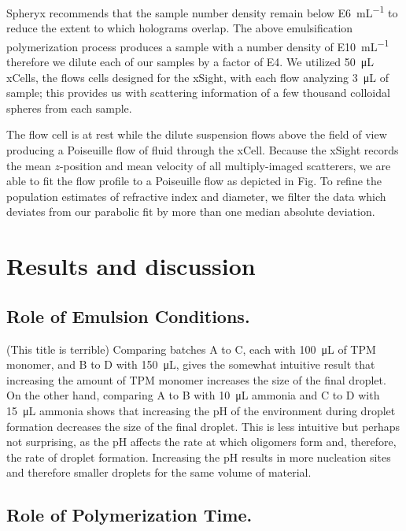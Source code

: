 Spheryx recommends that the sample number density remain below 
\SI{E6}{\milli\liter^{-1}} to reduce the extent to which
holograms overlap. The above emulsification polymerization process produces
a sample with a number density of \SI{E10}{\milli\liter^{-1}} therefore we
dilute each of our samples by a factor of \si{E4}. We utilized \SI{50}{\micro \liter}
xCells, the flows cells designed for the xSight, with each flow
analyzing \SI{3}{\micro\liter} of sample; this provides us with scattering
information of a few thousand colloidal spheres from each sample.

The flow cell is at rest while the dilute suspension flows above
the field of view producing a Poiseuille flow of fluid through the
xCell. Because the xSight records the mean $z$-position and mean 
velocity of all multiply-imaged scatterers, we are able to fit the flow
profile to a Poiseuille flow as depicted in Fig. %
To refine the population estimates of refractive index and diameter, 
we filter the data which deviates from our parabolic fit by more 
than one median absolute deviation.

\section{Results and discussion}
\subsection{Role of Emulsion Conditions.}
(This title is terrible)
Comparing batches A to C, each with \SI{100}{\micro \liter} of TPM monomer, and B to D with \SI{150}{\micro \liter}, gives the somewhat intuitive result that increasing the amount of TPM monomer increases the size of the final droplet. On the other hand, comparing A to B with \SI{10}{\micro \liter} ammonia and C to D with \SI{15}{\micro \liter} ammonia shows that increasing the 
pH of the environment during droplet formation decreases the size of the 
final droplet. This is less intuitive but perhaps not surprising, as the pH 
affects the rate at which oligomers form and, therefore, the rate of droplet 
formation. Increasing the pH results in more nucleation sites and therefore smaller droplets 
for the same volume of material. 

\subsection{Role of Polymerization Time.}

